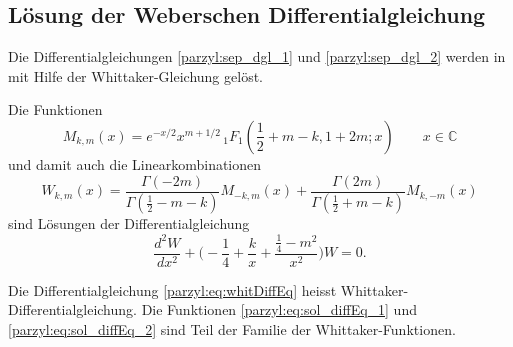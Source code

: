 \subsection{Lösung der Weberschen Differentialgleichung}
Die Differentialgleichungen \eqref{parzyl:sep_dgl_1} und
\eqref{parzyl:sep_dgl_2} werden in \cite{parzyl:whittaker}
mit Hilfe der Whittaker-Gleichung gelöst.
\begin{satz}
	Die Funktionen 
	\begin{equation}
		 M_{k,m}(x) = 
		    e^{-x/2} x^{m+1/2} \,
		    {}_{1} F_{1}
		    (
		        {\textstyle \frac{1}{2}} 
		        + m - k, 1 + 2m; x) \qquad x \in \mathbb{C}
		 \label{parzyl:eq:sol_diffEq_1}
	\end{equation}
	und damit auch die Linearkombinationen 
	 \begin{equation}
		        W_{k,m}(x) = \frac{
		            \Gamma ( -2m)
		        }{
		            \Gamma ( {\textstyle \frac{1}{2}} - m - k)
		        }
		        M_{-k, m} (x)
		        +
		        \frac{
		            \Gamma ( 2m)
		        }{
		            \Gamma ( {\textstyle \frac{1}{2}} + m - k)
		        }
		       M_{k, -m} (x)
		      \label{parzyl:eq:sol_diffEq_2}
	\end{equation}
	sind Lösungen der Differentialgleichung 
	\begin{equation}
		        \frac{d^2W}{d x^2} +
		        \biggl( -\frac{1}{4}  + \frac{k}{x} + \frac{\frac{1}{4} - m^2}{x^2} \biggr) W = 0.
		        \label{parzyl:eq:whitDiffEq}
	\end{equation}
	
\end{satz}
\begin{definition}
Die Differentialgleichung \ref{parzyl:eq:whitDiffEq}  heisst
Whittaker-Differentialgleichung.
%
Die Funktionen \ref{parzyl:eq:sol_diffEq_1} und \ref{parzyl:eq:sol_diffEq_2}
sind Teil der Familie der Whittaker-Funktionen.
%
\end{definition}
